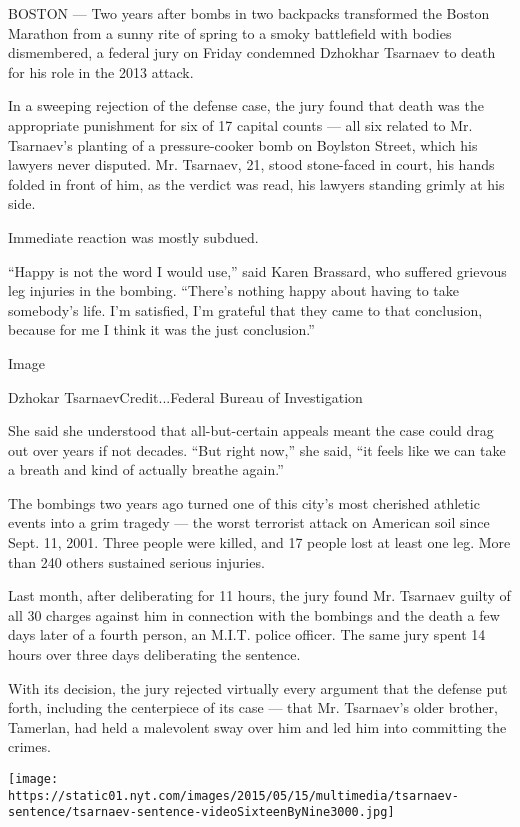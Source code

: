 BOSTON --- Two years after bombs in two backpacks transformed the Boston
Marathon from a sunny rite of spring to a smoky battlefield with bodies
dismembered, a federal jury on Friday condemned Dzhokhar Tsarnaev to
death for his role in the 2013 attack.

In a sweeping rejection of the defense case, the jury found that death
was the appropriate punishment for six of 17 capital counts --- all six
related to Mr. Tsarnaev's planting of a pressure-cooker bomb on Boylston
Street, which his lawyers never disputed. Mr. Tsarnaev, 21, stood
stone-faced in court, his hands folded in front of him, as the verdict
was read, his lawyers standing grimly at his side.

Immediate reaction was mostly subdued.

``Happy is not the word I would use,'' said Karen Brassard, who suffered
grievous leg injuries in the bombing. ``There's nothing happy about
having to take somebody's life. I'm satisfied, I'm grateful that they
came to that conclusion, because for me I think it was the just
conclusion.''

Image

Dzhokar TsarnaevCredit...Federal Bureau of Investigation

She said she understood that all-but-certain appeals meant the case
could drag out over years if not decades. ``But right now,'' she said,
``it feels like we can take a breath and kind of actually breathe
again.''

The bombings two years ago turned one of this city's most cherished
athletic events into a grim tragedy --- the worst terrorist attack on
American soil since Sept. 11, 2001. Three people were killed, and 17
people lost at least one leg. More than 240 others sustained serious
injuries.

Last month, after deliberating for 11 hours, the jury found Mr. Tsarnaev
guilty of all 30 charges against him in connection with the bombings and
the death a few days later of a fourth person, an M.I.T. police officer.
The same jury spent 14 hours over three days deliberating the sentence.

With its decision, the jury rejected virtually every argument that the
defense put forth, including the centerpiece of its case --- that Mr.
Tsarnaev's older brother, Tamerlan, had held a malevolent sway over him
and led him into committing the crimes.

\texttt{[image: https://static01.nyt.com/images/2015/05/15/multimedia/tsarnaev-sentence/tsarnaev-sentence-videoSixteenByNine3000.jpg]}

